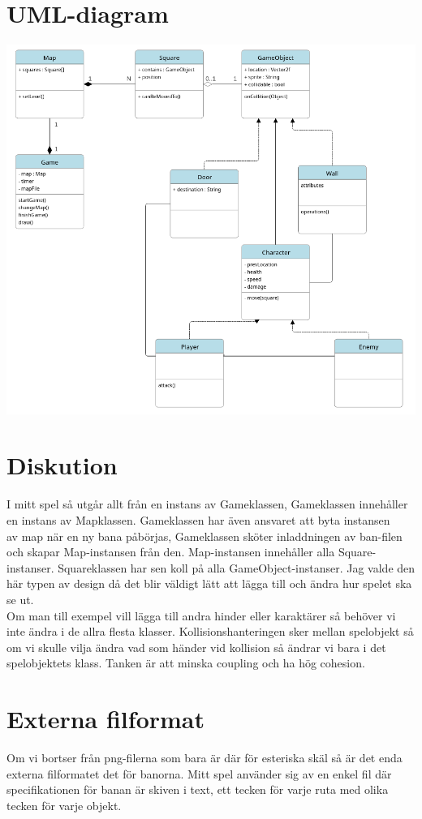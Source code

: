 \documentclass{TDP005mall}
\begin{document}
\section{UML-diagram}
\includegraphics[scale=0.52]{uml-diagram}

\newpage
\section{Diskution}
I mitt spel så utgår allt från en instans av Gameklassen, Gameklassen innehåller en instans av Mapklassen. Gameklassen har även ansvaret att byta instansen \\
av map när en ny bana påbörjas, Gameklassen sköter inladdningen av ban-filen och skapar Map-instansen från den. 
Map-instansen innehåller alla Square-instanser. Squareklassen har sen koll på alla GameObject-instanser.
Jag valde den här typen av design då det blir väldigt lätt att lägga till och ändra hur spelet ska se ut. \\
Om man till exempel vill lägga till andra hinder eller karaktärer så behöver vi inte ändra i de allra flesta klasser.
Kollisionshanteringen sker mellan spelobjekt så om vi skulle vilja ändra vad som händer vid kollision så ändrar vi bara i det spelobjektets klass.
Tanken är att minska coupling och ha hög cohesion.

\section{Externa filformat}
Om vi bortser från png-filerna som bara är där för esteriska skäl så är det enda externa filformatet det för banorna.
Mitt spel använder sig av en enkel fil där specifikationen för banan är skiven i text, ett tecken för varje ruta med olika tecken för varje objekt.
\end{document}
